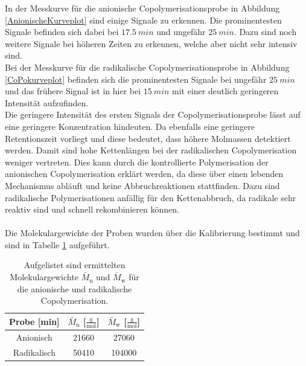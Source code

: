 \documentclass[10pt,a4paper,ngerman]{scrartcl}
\begin{document}
		In der Messkurve für die anionische Copolymerisationsprobe in Abbildung \ref{AnionischeKurveplot} sind einige Signale zu erkennen. Die 
		prominentesten Signale befinden sich dabei bei $\SI{17,5}{min}$ und ungefähr $\SI{25}{min}$. Dazu sind noch weitere Signale bei höheren 
		Zeiten zu erkennen, welche aber nicht sehr intensiv sind. \\
		Bei der Messkurve für die radikalische Copolymerisationsprobe in Abbildung \ref{CoPokurveplot} befinden sich die prominentesten Signale bei ungefähr 
		$\SI{25}{min}$ und das frühere Signal ist in hier bei $\SI{15}{min}$ mit einer deutlich geringeren Intensität aufzufinden. \\
		Die geringere Intensität des ersten Signals der Copolymerisationsprobe lässt auf eine geringere Konzentration hindeuten. Da ebenfalls 
		eine geringere Retentionszeit vorliegt und diese bedeutet, dass höhere Molmassen detektiert werden. Damit sind hohe Kettenlängen bei der radikalischen 
		Copolymerisation weniger vertreten. Dies kann durch die kontrollierte Polymerisation der anionischen Copolymerisation 
		erklärt werden, da diese über einen lebenden Mechanismus abläuft und keine Abbruchreaktionen stattfinden. Dazu sind 
		radikalische Polymerisationen anfällig für den Kettenabbruch, da radikale sehr reaktiv sind und schnell rekombinieren können. \\\\

		Die Molekulargewichte der Proben wurden über die Kalibrierung bestimmt und sind in Tabelle \ref{Molekulargewichteanionischradikalisch} aufgeführt.

		\begin{table}[H]
    	\begin{center}
        	\caption{Aufgelistet sind ermittelten Molekulargewichte $\bar{M}_\text{n}$ und $\bar{M}_\text{w}$ für die anionische und radikalische Copolymerisation.}
        	\label{Molekulargewichteanionischradikalisch}
            	\begin{tabular}{c|c|c}
					\hline
					Probe [min]& $\bar{M}_\text{n}$ [$\frac{\text{g}}{\text{mol}}$] & $\bar{M}_\text{w}$ [$\frac{\text{g}}{\text{mol}}$]\\
					\hline  
					Anionisch	& 21660	& 27060	 \\
					Radikalisch	& 50410	& 104000	 \\
				\end{tabular}
		\end{center}
		\end{table}
\end{document}
